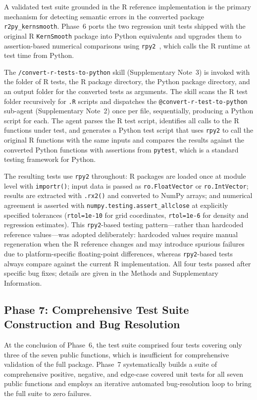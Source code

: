 \documentclass[12pt,a4paper]{article}
\makeatletter
\newcommand{\skill}[1]{\texttt{/#1}}
\newcommand{\agent}[1]{\texttt{@#1}}
\newcommand{\pkg}[1]{\texttt{#1}}
\newcommand{\suppnote}[1]{Supplementary Note~#1}
\makeatother
\begin{document}
A validated test suite grounded in the R reference implementation is the primary mechanism for detecting semantic errors in the converted package \pkg{r2py\_kernsmooth}. Phase~6 ports the two regression unit tests shipped with the original R \pkg{KernSmooth} package into Python equivalents and upgrades them to assertion-based numerical comparisons using \pkg{rpy2}~\cite{gautier2008rpy2}, which calls the R runtime at test time from Python.

The \skill{convert-r-tests-to-python} skill (\suppnote{3}) is invoked with the folder of R tests, the R package directory, the Python package directory, and an output folder for the converted tests as arguments. The skill scans the R test folder recursively for \texttt{.R} scripts and dispatches the \agent{convert-r-test-to-python} sub-agent (\suppnote{2}) once per file, sequentially, producing a Python script for each. The agent parses the R test script, identifies all calls to the R functions under test, and generates a Python test script that uses \pkg{rpy2} to call the original R functions with the same inputs and compares the results against the converted Python functions with assertions from \pkg{pytest}, which is a standard testing framework for Python.

The resulting tests use \pkg{rpy2} throughout: R packages are loaded once at module level with \texttt{importr()}; input data is passed as \texttt{ro.FloatVector} or \texttt{ro.IntVector}; results are extracted with \texttt{.rx2()} and converted to NumPy arrays; and numerical agreement is asserted with \texttt{numpy.testing.assert\_allclose} at explicitly specified tolerances (\texttt{rtol=1e-10} for grid coordinates, \texttt{rtol=1e-6} for density and regression estimates). This \pkg{rpy2}-based testing pattern---rather than hardcoded reference values---was adopted deliberately: hardcoded values require manual regeneration when the R reference changes and may introduce spurious failures due to platform-specific floating-point differences, whereas \pkg{rpy2}-based tests always compare against the current R implementation. All four tests passed after specific bug fixes; details are given in the Methods and Supplementary Information.

\subsection{Phase 7: Comprehensive Test Suite Construction and Bug Resolution}
\label{sec:phase7}

At the conclusion of Phase~6, the test suite comprised four tests covering only three of the seven public functions, which is insufficient for comprehensive validation of the full package. Phase~7 systematically builds a suite of comprehensive positive, negative, and edge-case covered unit tests for all seven public functions and employs an iterative automated bug-resolution loop to bring the full suite to zero failures.
\end{document}
